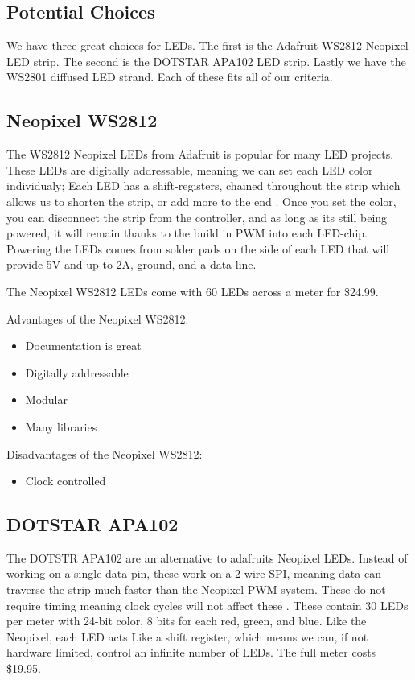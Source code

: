 	\subsection{Potential Choices}
	\noindent We have three great choices for LEDs. The first is the Adafruit
	WS2812 Neopixel LED strip. The second is the DOTSTAR APA102 LED strip.
	Lastly we have the WS2801 diffused LED strand. Each of these fits all of
	our criteria.
	\subsection{Neopixel WS2812}
	\noindent The WS2812 Neopixel LEDs from Adafruit is popular for many LED
	projects. These LEDs are digitally addressable, meaning we can set each LED
	color individualy; Each LED has a shift-registers, chained throughout the
	strip which allows us to shorten the strip, or add more to the end
	\cite[Pg 7]{neo}. Once you set the color, you can disconnect the strip from
	the controller, and as long as its still being powered, it will remain
	thanks to the build in PWM into each LED-chip. Powering the LEDs comes
	from solder pads on the side of each LED that will provide 5V and up to 2A,
	ground, and a data line.


	\vspace{5mm}
	\noindent The Neopixel WS2812 LEDs come with 60 LEDs across a meter for \$24.99.

	\vspace{5mm}
	\noindent Advantages of the Neopixel WS2812:
	\begin{itemize}
		\item Documentation is great
		\item Digitally addressable
		\item Modular
		\item Many libraries
	\end{itemize}
	Disadvantages of the Neopixel WS2812:
	\begin{itemize}
		\item Clock controlled
	\end{itemize}
	\subsection{DOTSTAR APA102}
	\noindent The DOTSTR APA102 are an alternative to adafruits Neopixel LEDs. Instead
	of working on a single data pin, these work on a 2-wire SPI, meaning data
	can traverse the strip much faster than the Neopixel PWM system. These do
	not require timing meaning clock cycles will not affect these
	\cite[Pg2]{dotstar}. These contain 30 LEDs per meter with 24-bit color,
	8 bits for each red, green, and blue. Like the Neopixel, each LED acts Like
	a shift register, which means we can, if not hardware limited, control an
	infinite number of LEDs. The full meter costs \$19.95.

